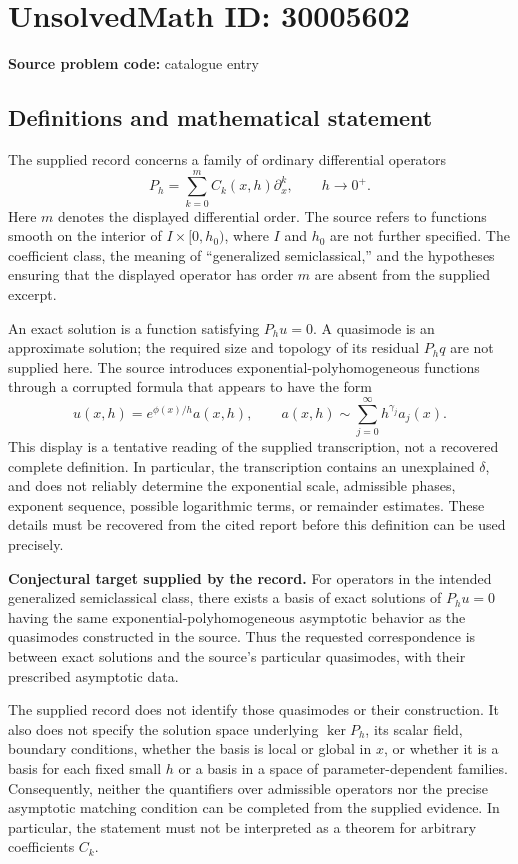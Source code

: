 \documentclass[11pt]{article}
\begin{document}
\section*{UnsolvedMath ID: 30005602}
\textbf{Source problem code:} catalogue entry
\subsection{Definitions and mathematical statement}
The supplied record concerns a family of ordinary differential operators
\[
P_h=\sum_{k=0}^{m}C_k(x,h)\partial_x^k,
\qquad h\to0^+.
\]
Here \(m\) denotes the displayed differential order. The source refers to functions smooth on the interior of \(I\times[0,h_0)\), where \(I\) and \(h_0\) are not further specified. The coefficient class, the meaning of ``generalized semiclassical,'' and the hypotheses ensuring that the displayed operator has order \(m\) are absent from the supplied excerpt.

An exact solution is a function satisfying \(P_hu=0\). A quasimode is an approximate solution; the required size and topology of its residual \(P_hq\) are not supplied here. The source introduces exponential-polyhomogeneous functions through a corrupted formula that appears to have the form
\[
u(x,h)=e^{\phi(x)/h}a(x,h),
\qquad a(x,h)\sim\sum_{j=0}^{\infty}h^{\gamma_j}a_j(x).
\]
This display is a tentative reading of the supplied transcription, not a recovered complete definition. In particular, the transcription contains an unexplained \(\delta\), and does not reliably determine the exponential scale, admissible phases, exponent sequence, possible logarithmic terms, or remainder estimates. These details must be recovered from the cited report before this definition can be used precisely.

\textbf{Conjectural target supplied by the record.} For operators in the intended generalized semiclassical class, there exists a basis of exact solutions of \(P_hu=0\) having the same exponential-polyhomogeneous asymptotic behavior as the quasimodes constructed in the source. Thus the requested correspondence is between exact solutions and the source's particular quasimodes, with their prescribed asymptotic data.

The supplied record does not identify those quasimodes or their construction. It also does not specify the solution space underlying \(\ker P_h\), its scalar field, boundary conditions, whether the basis is local or global in \(x\), or whether it is a basis for each fixed small \(h\) or a basis in a space of parameter-dependent families. Consequently, neither the quantifiers over admissible operators nor the precise asymptotic matching condition can be completed from the supplied evidence. In particular, the statement must not be interpreted as a theorem for arbitrary coefficients \(C_k\).
\end{document}
